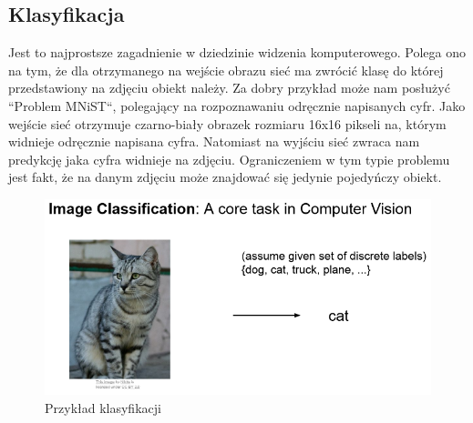 \documentclass{article}
\begin{document}
\subsection{Klasyfikacja}
Jest to najprostsze zagadnienie w dziedzinie widzenia komputerowego.
Polega ono na tym, że dla otrzymanego na wejście obrazu sieć ma zwrócić klasę do której przedstawiony na zdjęciu obiekt należy.
Za dobry przykład może nam posłużyć ``Problem MNiST``, polegający na rozpoznawaniu odręcznie napisanych cyfr.
Jako wejście sieć otrzymuje czarno-biały obrazek rozmiaru 16x16 pikseli na, którym widnieje odręcznie napisana cyfra.
Natomiast na wyjściu sieć zwraca nam predykcję jaka cyfra widnieje na zdjęciu.
Ograniczeniem w tym typie problemu jest fakt, że na danym zdjęciu może znajdować się jedynie pojedyńczy obiekt.
\begin{figure}[H]
  \centering
  \includegraphics[width=\linewidth]{images/klasyfikacja.png}
  \caption{Przykład klasyfikacji}
  \label{fig:klasyfikacja}
\end{figure}
\end{document}
